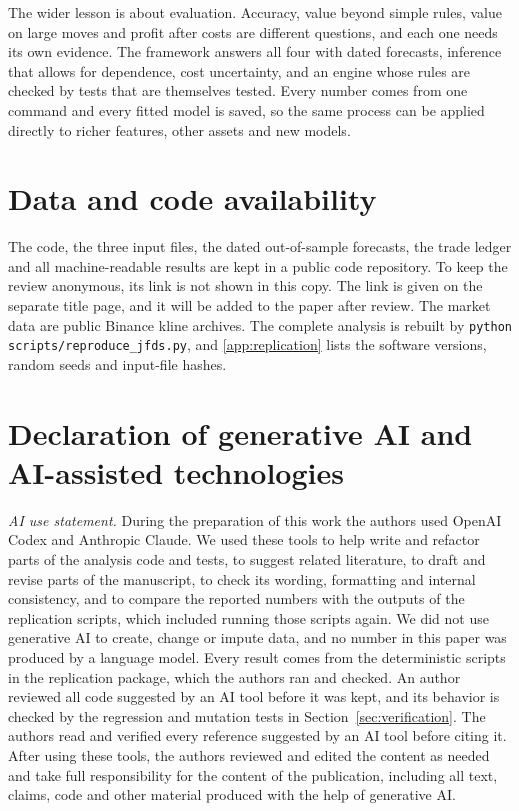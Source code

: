 \documentclass[preprint,12pt,authoryear,a4paper]{elsarticle}
\begin{document}
The wider lesson is about evaluation. Accuracy, value beyond simple rules, value on
large moves and profit after costs are different questions, and each one needs its
own evidence. The framework answers all four with dated forecasts, inference that
allows for dependence, cost uncertainty, and an engine whose rules are checked by
tests that are themselves tested. Every number comes from one command and every
fitted model is saved, so the same process can be applied directly to richer
features, other assets and new models.


\section*{Data and code availability}

The code, the three input files, the dated out-of-sample forecasts, the trade
ledger and all machine-readable results are kept in a public code repository. To
keep the review anonymous, its link is not shown in this copy. The link is given on
the separate title page, and it will be added to the paper after review.
The market data are public Binance kline archives. The complete analysis is rebuilt
by \texttt{python scripts/reproduce\_jfds.py}, and \ref{app:replication} lists the
software versions, random seeds and input-file hashes.

\section*{Declaration of generative AI and AI-assisted technologies}

\emph{AI use statement.} During the preparation of this work the authors used
OpenAI Codex and Anthropic Claude. We used these tools to help write and refactor
parts of the analysis code and tests, to suggest related literature, to draft and
revise parts of the manuscript, to check its wording, formatting and internal
consistency, and to compare the reported numbers with the outputs of the
replication scripts, which included running those scripts again. We did not use
generative AI to create, change or impute data, and no number in this paper was
produced by a language model. Every result comes from the deterministic scripts in
the replication package, which the authors ran and checked. An author reviewed all
code suggested by an AI tool before it was kept, and its behavior is checked by the
regression and mutation tests in Section~\ref{sec:verification}. The authors read
and verified every reference suggested by an AI tool before citing it. After using
these tools, the authors reviewed and edited the content as needed and take full
responsibility for the content of the publication, including all text, claims, code
and other material produced with the help of generative AI.
\end{document}
